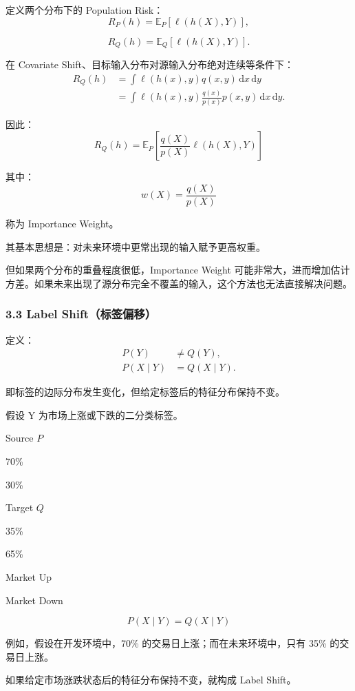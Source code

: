 定义两个分布下的 Population Risk：
\[R_P(h)=\mathbb E_P[\ell(h(X),Y)],\]

\[R_Q(h)=\mathbb E_Q[\ell(h(X),Y)].\]

在 Covariate Shift、目标输入分布对源输入分布绝对连续等条件下：
\[\begin{aligned}
R_Q(h)
&=\int \ell(h(x),y)q(x,y)\,\mathrm dx\,\mathrm dy\\
&=\int \ell(h(x),y)
\frac{q(x)}{p(x)}
p(x,y)\,\mathrm dx\,\mathrm dy.
\end{aligned}\]

因此：
\[\boxed{
R_Q(h)
=
\mathbb E_P
\left[
\frac{q(X)}{p(X)}
\ell(h(X),Y)
\right]
}\]

其中：
\[w(X)=\frac{q(X)}{p(X)}\]

称为 Importance Weight。

其基本思想是：对未来环境中更常出现的输入赋予更高权重。

但如果两个分布的重叠程度很低，Importance Weight 可能非常大，进而增加估计方差。如果未来出现了源分布完全不覆盖的输入，这个方法也无法直接解决问题。

\hypertarget{part-2-23-0001-label-shiftux6807ux7b7eux504fux79fb}{%
\subsubsection{3.3 Label Shift（标签偏移）}\label{part-2-23-0001-label-shiftux6807ux7b7eux504fux79fb}}

定义：
\[\boxed{
\begin{aligned}
P(Y)&\neq Q(Y),\\
P(X\mid Y)&=Q(X\mid Y).
\end{aligned}
}\]

即标签的边际分布发生变化，但给定标签后的特征分布保持不变。

假设 Y 为市场上涨或下跌的二分类标签。

Source \(P\)

70\%

30\%

Target \(Q\)

35\%

65\%

Market Up

Market Down

\[P(X\mid Y)=Q(X\mid Y)\]

例如，假设在开发环境中，70\% 的交易日上涨；而在未来环境中，只有 35\% 的交易日上涨。

如果给定市场涨跌状态后的特征分布保持不变，就构成 Label Shift。

